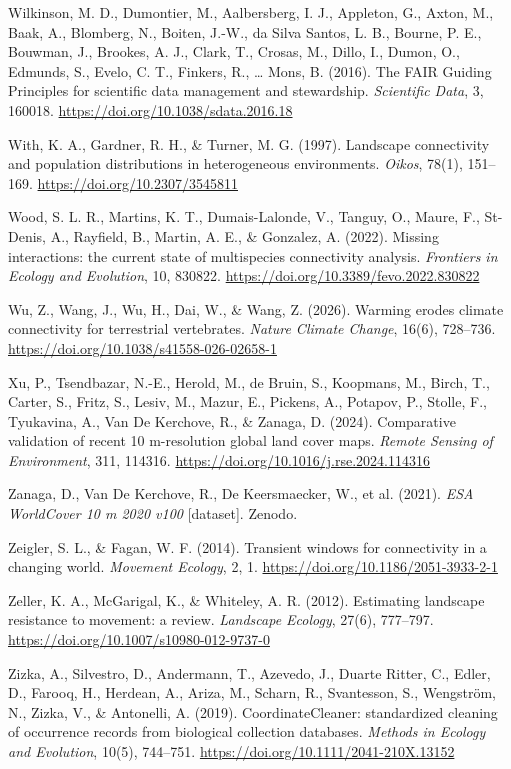 \documentclass[a4paper,11pt]{report}
\begin{document}
Wilkinson, M. D., Dumontier, M., Aalbersberg, I. J., Appleton, G., Axton, M., Baak, A., Blomberg, N., Boiten, J.-W., da Silva Santos, L. B., Bourne, P. E., Bouwman, J., Brookes, A. J., Clark, T., Crosas, M., Dillo, I., Dumon, O., Edmunds, S., Evelo, C. T., Finkers, R., \ldots{} Mons, B. (2016). The FAIR Guiding Principles for scientific data management and stewardship. \textit{Scientific Data}, 3, 160018. \url{https://doi.org/10.1038/sdata.2016.18}

With, K. A., Gardner, R. H., \& Turner, M. G. (1997). Landscape connectivity and population distributions in heterogeneous environments. \textit{Oikos}, 78(1), 151--169. \url{https://doi.org/10.2307/3545811}

Wood, S. L. R., Martins, K. T., Dumais-Lalonde, V., Tanguy, O., Maure, F., St-Denis, A., Rayfield, B., Martin, A. E., \& Gonzalez, A. (2022). Missing interactions: the current state of multispecies connectivity analysis. \textit{Frontiers in Ecology and Evolution}, 10, 830822. \url{https://doi.org/10.3389/fevo.2022.830822}

Wu, Z., Wang, J., Wu, H., Dai, W., \& Wang, Z. (2026). Warming erodes climate connectivity for terrestrial vertebrates. \textit{Nature Climate Change}, 16(6), 728--736. \url{https://doi.org/10.1038/s41558-026-02658-1}

Xu, P., Tsendbazar, N.-E., Herold, M., de Bruin, S., Koopmans, M., Birch, T., Carter, S., Fritz, S., Lesiv, M., Mazur, E., Pickens, A., Potapov, P., Stolle, F., Tyukavina, A., Van De Kerchove, R., \& Zanaga, D. (2024). Comparative validation of recent 10 m-resolution global land cover maps. \textit{Remote Sensing of Environment}, 311, 114316. \url{https://doi.org/10.1016/j.rse.2024.114316}

Zanaga, D., Van De Kerchove, R., De Keersmaecker, W., et al. (2021). \textit{ESA WorldCover 10 m 2020 v100} [dataset]. Zenodo.

Zeigler, S. L., \& Fagan, W. F. (2014). Transient windows for connectivity in a changing world. \textit{Movement Ecology}, 2, 1. \url{https://doi.org/10.1186/2051-3933-2-1}

Zeller, K. A., McGarigal, K., \& Whiteley, A. R. (2012). Estimating landscape resistance to movement: a review. \textit{Landscape Ecology}, 27(6), 777--797. \url{https://doi.org/10.1007/s10980-012-9737-0}

Zizka, A., Silvestro, D., Andermann, T., Azevedo, J., Duarte Ritter, C., Edler, D., Farooq, H., Herdean, A., Ariza, M., Scharn, R., Svantesson, S., Wengström, N., Zizka, V., \& Antonelli, A. (2019). CoordinateCleaner: standardized cleaning of occurrence records from biological collection databases. \textit{Methods in Ecology and Evolution}, 10(5), 744--751. \url{https://doi.org/10.1111/2041-210X.13152}
\end{document}
